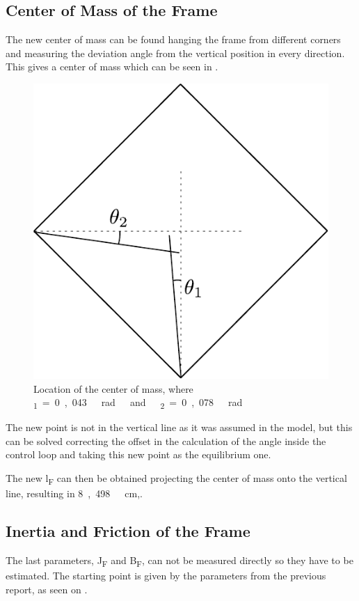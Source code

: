 \subsection{Center of Mass of the Frame}
The new center of mass can be found hanging the frame from different corners and measuring the deviation angle from the vertical position in every direction. This gives a center of mass which can be seen in . 
\begin{figure}[H]
	\centering
	\includegraphics[scale=0.6]{figures/centerOfMassDiagram}
	\caption{Location of the center of mass, where \si{\theta_1=0,043\ rad\ and\ \theta_2=0,078\ rad}}
	\label{centerOfMassDiagram}
\end{figure}


The new point is not in the vertical line as it was assumed in the model, but this can be solved correcting the offset in the calculation of the angle inside the control loop and taking this new point as the equilibrium one. 

The new \si{l_F} can then be obtained projecting the center of mass onto the vertical line, resulting in \si{8,498\ cm},.

\subsection{Inertia and Friction of the Frame}
The last parameters, \si{J_F} and \si{B_F}, can not be measured directly so they have to be estimated. The starting point is given by the parameters from the previous report, as seen on . 

